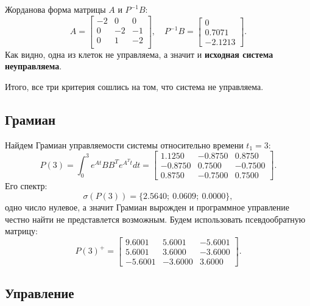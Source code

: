 Жорданова форма матрицы $A$ и $P^{-1}B$:
\begin{equation*}
    A =\begin{bmatrix}
        
-2&	   0&	   0\\
0&	  -2&	   -1\\
0&	   1&	  -2\\

    \end{bmatrix},\quad
    P^{-1}B=\begin{bmatrix}
        0 \\ 0.7071 \\ -2.1213
    \end{bmatrix}.
\end{equation*}
Как видно, одна из клеток не управляема, а значит и \textbf{исходная система
неуправляема}.

Итого, все три критерия сошлись на том, что система не управляема.

\subsection{Грамиан}

Найдем Грамиан управляемости системы относительно времени $t_1=3$:
\begin{equation*}
    P(3)=\int_{0}^{3}e^{At}BB^Te^{A^Tt}dt=
    \begin{bmatrix}
        1.1250  & -0.8750   & 0.8750\\
        -0.8750  &  0.7500 &  -0.7500\\
         0.8750   &-0.7500&    0.7500
    \end{bmatrix}.
\end{equation*}
Его спектр:
\begin{equation*}
    \sigma(P(3))=\{ 2.5640;\ 
    0.0609;\ 
    0.0000\},
\end{equation*}
одно число нулевое, а значит Грамиан вырожден и программное управление честно найти не представлется
возможным. Будем использовать псевдообратную матрицу:
\begin{equation*}
    P(3)^+=\begin{bmatrix}
        9.6001&    5.6001  & -5.6001\\
        5.6001 &   3.6000 &  -3.6000\\
       -5.6001  & -3.6000&    3.6000
    \end{bmatrix}.
\end{equation*}

\subsection{Управление}

